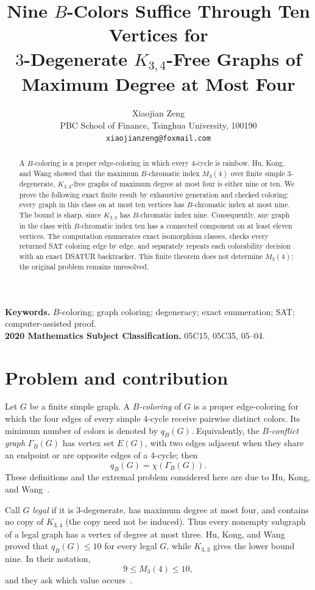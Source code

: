 \documentclass[11pt]{article}
\title{Nine $B$-Colors Suffice Through Ten Vertices for\\
$3$-Degenerate $K_{3,4}$-Free Graphs of Maximum Degree at Most Four}
\author{Xiaojian Zeng\\
PBC School of Finance, Tsinghua University, 100190\\
\texttt{xiaojianzeng@foxmail.com}}
\date{}
\newcommand{\GB}{\Gamma_{B}}
\newcommand{\qB}{q_{B}}
\begin{document}
\maketitle

\begin{abstract}
A $B$-coloring is a proper edge-coloring in which every $4$-cycle is
rainbow.  Hu, Kong, and Wang showed that the maximum $B$-chromatic index
$M_3(4)$ over finite simple $3$-degenerate, $K_{3,4}$-free graphs of maximum
degree at most four is either nine or ten.  We prove the following exact
finite result by exhaustive generation and checked coloring: every graph in
this class on at most ten vertices has $B$-chromatic index at most nine.  The
bound is sharp, since $K_{3,3}$ has $B$-chromatic index nine.  Consequently,
any graph in the class with $B$-chromatic index ten has a connected component
on at least eleven vertices.  The computation enumerates exact isomorphism
classes, checks every returned SAT coloring edge by edge, and separately
repeats each colorability decision with an exact DSATUR backtracker.  This
finite theorem does not determine $M_3(4)$; the original problem remains
unresolved.
\end{abstract}

\noindent\textbf{Keywords.} $B$-coloring; graph coloring; degeneracy;
exact enumeration; SAT; computer-assisted proof.\\
\textbf{2020 Mathematics Subject Classification.} 05C15, 05C35, 05--04.

\section{Problem and contribution}

Let $G$ be a finite simple graph.  A \emph{$B$-coloring} of $G$ is a proper
edge-coloring for which the four edges of every simple $4$-cycle receive
pairwise distinct colors.  Its minimum number of colors is denoted by
$\qB(G)$.  Equivalently, the \emph{$B$-conflict graph} $\GB(G)$ has vertex set
$E(G)$, with two edges adjacent when they share an endpoint or are opposite
edges of a $4$-cycle; then
\[
  \qB(G)=\chi(\GB(G)).
\]
These definitions and the extremal problem considered here are due to Hu,
Kong, and Wang~\cite{HuKongWang2026}.

Call $G$ \emph{legal} if it is $3$-degenerate, has maximum degree at most
four, and contains no copy of $K_{3,4}$ (the copy need not be induced).  Thus
every nonempty subgraph of a legal graph has a vertex of degree at most three.
Hu, Kong, and Wang proved that $\qB(G)\leq 10$ for every legal $G$, while
$K_{3,3}$ gives the lower bound nine.  In their notation,
\[
  9\leq M_3(4)\leq 10,
\]
and they ask which value occurs~\cite[Theorem~2.8 and
Problem~4.1]{HuKongWang2026}.
\end{document}
